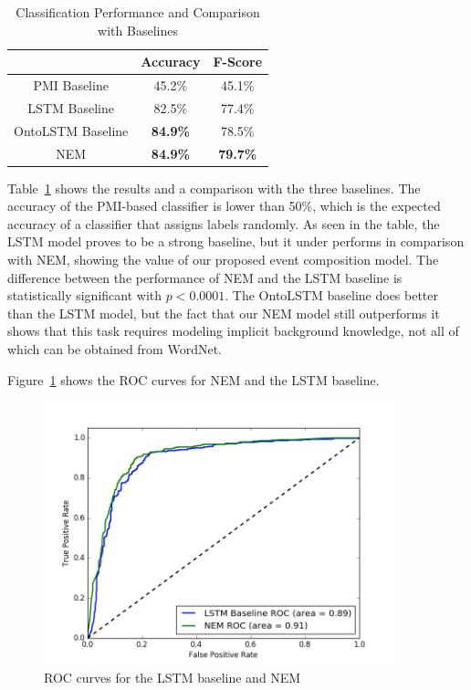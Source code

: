 \begin{table}
\begin{center}
  \begin{tabular}[c]{ccc}
 \toprule
 \multicolumn{1}{c}{}& \textbf{Accuracy} & \textbf{F-Score} \\
 \midrule
 PMI Baseline& 45.2\% & 45.1\%\\
 LSTM Baseline & 82.5\% & 77.4\%\\
 OntoLSTM Baseline & \textbf{84.9\%} & 78.5\%\\
 \midrule
 NEM & \textbf{84.9\%}& \textbf{79.7\%}\\
 \bottomrule
  \end{tabular}
\end{center}
 \caption{Classification Performance and Comparison with Baselines}\label{table:nem_anomaly_results}
\end{table}

Table~\ref{table:nem_anomaly_results} shows the results and a comparison with
the three baselines.
The accuracy of the 
PMI-based classifier is lower than 50\%, which is the expected accuracy of a classifier that assigns labels randomly.  
As seen in the table, the LSTM model proves to be a strong baseline, but it under performs in comparison with NEM,
showing the value of our proposed event composition model. The difference between the performance of
NEM and the LSTM baseline is statistically significant with $p < 0.0001$.
The OntoLSTM baseline does better than the LSTM model, but the fact that our NEM
model still outperforms it shows that this task requires modeling implicit
background knowledge, not all of which can be obtained from WordNet.

Figure~\ref{fig:nem_roc} shows the ROC curves
for NEM and the LSTM baseline.
\begin{figure}
  \begin{center}
  \includegraphics[width=4in]{figures/nem_roc.png}
  \caption{ROC curves for the LSTM baseline and NEM}\label{fig:nem_roc}
  \end{center}
\end{figure}


